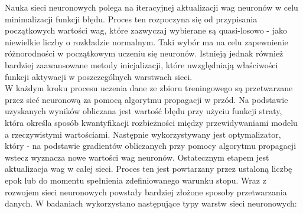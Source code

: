 \documentclass[a4paper,twoside,12pt]{book}
\begin{document}
Nauka sieci neuronowych polega na iteracyjnej aktualizacji wag neuronów w celu minimalizacji funkcji błędu. Proces ten rozpoczyna się od przypisania początkowych wartości wag, które zazwyczaj wybierane są quasi-losowo - jako niewielkie liczby o rozkładzie normalnym. Taki wybór ma na celu zapewnienie różnorodności w początkowym uczeniu się neuronów. Istnieją jednak również bardziej zaawansowane metody inicjalizacji, które uwzględniają właściwości funkcji aktywacji w poszczególnych warstwach sieci.\\
W każdym kroku procesu uczenia dane ze zbioru treningowego są przetwarzane przez sieć neuronową za pomocą algorytmu propagacji w przód. Na podstawie uzyskanych wyników obliczana jest wartość błędu przy użyciu funkcji straty, która określa sposób kwantyfikacji rozbieżności między przewidywaniami modelu a rzeczywistymi wartościami. Następnie wykorzystywany jest optymalizator, który - na podstawie gradientów obliczanych przy pomocy algorytmu propagacji wstecz wyznacza nowe wartości wag neuronów. Ostatecznym etapem jest aktualizacja wag w całej sieci. Proces ten jest powtarzany przez ustaloną liczbę epok lub do momentu spełnienia zdefiniowanego warunku stopu.
\newpage
Wraz z rozwojem sieci neuronowych powstały bardziej złożone sposoby przetwarzania danych. W badaniach wykorzystano następujące typy warstw sieci neuronowych:
\end{document}
